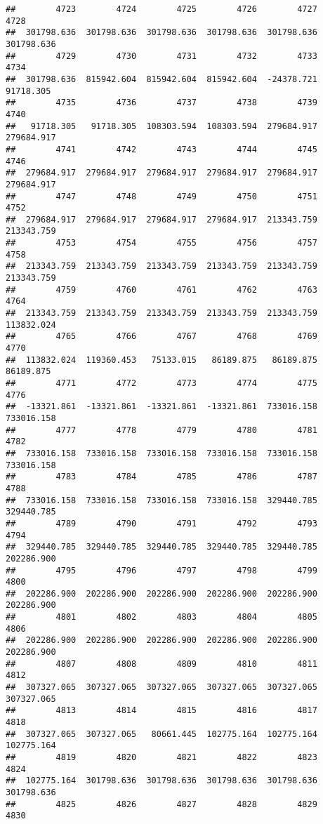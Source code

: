 \documentclass[
]{book}
\begin{document}
\begin{verbatim}
##        4723        4724        4725        4726        4727        4728 
##  301798.636  301798.636  301798.636  301798.636  301798.636  301798.636 
##        4729        4730        4731        4732        4733        4734 
##  301798.636  815942.604  815942.604  815942.604  -24378.721   91718.305 
##        4735        4736        4737        4738        4739        4740 
##   91718.305   91718.305  108303.594  108303.594  279684.917  279684.917 
##        4741        4742        4743        4744        4745        4746 
##  279684.917  279684.917  279684.917  279684.917  279684.917  279684.917 
##        4747        4748        4749        4750        4751        4752 
##  279684.917  279684.917  279684.917  279684.917  213343.759  213343.759 
##        4753        4754        4755        4756        4757        4758 
##  213343.759  213343.759  213343.759  213343.759  213343.759  213343.759 
##        4759        4760        4761        4762        4763        4764 
##  213343.759  213343.759  213343.759  213343.759  213343.759  113832.024 
##        4765        4766        4767        4768        4769        4770 
##  113832.024  119360.453   75133.015   86189.875   86189.875   86189.875 
##        4771        4772        4773        4774        4775        4776 
##  -13321.861  -13321.861  -13321.861  -13321.861  733016.158  733016.158 
##        4777        4778        4779        4780        4781        4782 
##  733016.158  733016.158  733016.158  733016.158  733016.158  733016.158 
##        4783        4784        4785        4786        4787        4788 
##  733016.158  733016.158  733016.158  733016.158  329440.785  329440.785 
##        4789        4790        4791        4792        4793        4794 
##  329440.785  329440.785  329440.785  329440.785  329440.785  202286.900 
##        4795        4796        4797        4798        4799        4800 
##  202286.900  202286.900  202286.900  202286.900  202286.900  202286.900 
##        4801        4802        4803        4804        4805        4806 
##  202286.900  202286.900  202286.900  202286.900  202286.900  202286.900 
##        4807        4808        4809        4810        4811        4812 
##  307327.065  307327.065  307327.065  307327.065  307327.065  307327.065 
##        4813        4814        4815        4816        4817        4818 
##  307327.065  307327.065   80661.445  102775.164  102775.164  102775.164 
##        4819        4820        4821        4822        4823        4824 
##  102775.164  301798.636  301798.636  301798.636  301798.636  301798.636 
##        4825        4826        4827        4828        4829        4830 

\end{verbatim}
\end{document}
